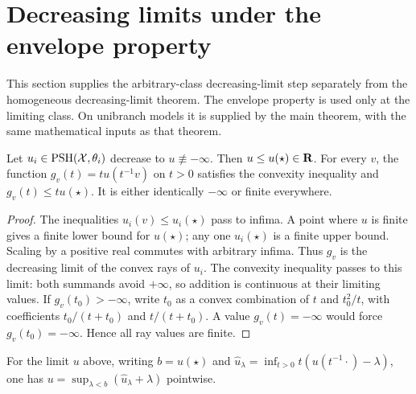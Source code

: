 \section{Decreasing limits under the envelope property}
\label{sec:ep-decreasing-limits}

This section supplies the arbitrary-class decreasing-limit step separately from
the homogeneous decreasing-limit theorem. The envelope property is used only
at the limiting class. On unibranch models it is supplied by the main theorem,
with the same mathematical inputs as that theorem.

\begin{lemma}\label{lem:ep-limit-convex-rays}
\leanok
{}
Let $u_i\in\operatorname{PSH}(\mathcal X,\theta_i)$ decrease to $u\not\equiv-\infty$.
Then $u\le u(\star)\in\mathbf{R}$. For every $v$, the function
$g_v(t)=t u(t^{-1}v)$ on $t>0$ satisfies the convexity inequality and
$g_v(t)\le t u(\star)$. It is either identically $-\infty$ or finite everywhere.
\end{lemma}

\begin{proof}
The inequalities $u_i(v)\le u_i(\star)$ pass to infima. A point where $u$ is
finite gives a finite lower bound for $u(\star)$; any one $u_i(\star)$ is a
finite upper bound. Scaling by a positive real commutes with arbitrary
infima. Thus $g_v$ is the decreasing limit of the convex rays of $u_i$.
The convexity inequality passes to this limit: both summands avoid $+\infty$,
so addition is continuous at their limiting values. If $g_v(t_0)>-\infty$,
write $t_0$ as a convex combination of $t$ and $t_0^2/t$, with coefficients
$t_0/(t+t_0)$ and $t/(t+t_0)$. A value $g_v(t)=-\infty$ would force
$g_v(t_0)=-\infty$. Hence all ray values are finite.
\end{proof}

\begin{lemma}\label{lem:ep-limit-reconstruction}
\leanok
{}
For the limit $u$ above, writing $b=u(\star)$ and
$\hat u_\lambda=\inf_{t>0}t(u(t^{-1}\cdot)-\lambda)$, one has
$u=\sup_{\lambda<b}(\hat u_\lambda+\lambda)$ pointwise.
\end{lemma}

